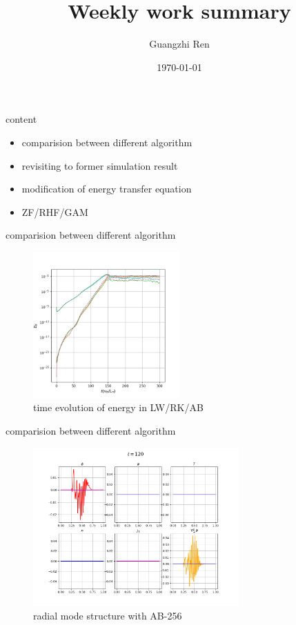 \documentclass{beamer}
\title{Weekly work summary}
\author{Guangzhi Ren}
\institute {}
\date{\today}
\begin{document}
\begin{frame}
\titlepage   
\end{frame}

\begin{frame}{content}
	\begin{itemize}
		\item comparision between different algorithm
		\item revisiting to former simulation result
		\item modification of energy transfer equation 
		\item ZF/RHF/GAM	
\end{itemize}
\end{frame}
	

\begin{frame}{comparision between different algorithm}
\begin{figure}[H]
	\centering
	\includegraphics[width=0.5\textwidth]{./images/ek-256.png}
	\caption{time evolution of energy in LW/RK/AB}
\end{figure}
\end{frame}	
	
\begin{frame}{comparision between different algorithm}
\begin{figure}[H]
	\centering
	\includegraphics[width=0.7\textwidth]{./images/ab-256-120.png}
	\caption{radial mode structure with AB-256}
\end{figure}
\end{frame}	
\end{document}
